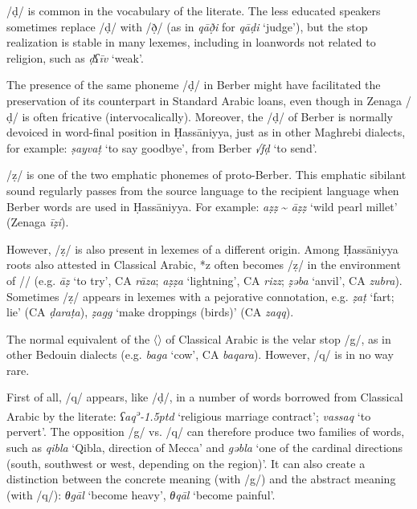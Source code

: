 \documentclass[output=paper]{langsci/langscibook}
\begin{document}
/ḍ/ is common in the vocabulary of the literate. The less educated speakers sometimes replace /ḍ/ with /ð̣/ (as in \textit{qāð̣i} for \textit{qāḍi} ‘judge’), but the stop realization is stable in many lexemes, including in loanwords not related to religion, such as \textit{ḍʕīv} ‘weak’.

The presence of the same phoneme /ḍ/ in Berber might have facilitated the preservation of its counterpart in Standard Arabic loans, even though in Zenaga /ḍ/ is often fricative (intervocalically). Moreover, the /ḍ/ of Berber is normally devoiced in word-final position in Ḥassāniyya, just as in other Maghrebi dialects, for example: \textit{ṣayvaṭ} ‘to say goodbye’, from Berber \textit{√fḍ} ‘to send’.

/ẓ/ is one of the two emphatic phonemes of proto-Berber. This emphatic sibilant sound regularly passes from the source language to the recipient language when Berber words are used in Ḥassāniyya. For example: \textit{aẓẓ} \~{} \textit{āẓẓ} ‘wild pearl millet’ (Zenaga \textit{īẓi}).

However, /ẓ/ is also present in lexemes of a different origin. Among Ḥassāniyya roots also attested in Classical Arabic, *z often becomes /ẓ/ in the environment of /{\R}/ (e.g. \textit{{\R}āẓ} ‘to try’, CA \textit{rāza}; \textit{{\R}aẓẓa} ‘lightning’, CA \textit{rizz}; \textit{ẓəb{\R}a} ‘anvil’, CA \textit{zubra}). Sometimes /ẓ/ appears in lexemes with a pejorative connotation, e.g. \textit{ẓ{\R}aṭ} ‘fart; lie’ (CA \textit{ḍaraṭa}), \textit{ẓagg} ‘make droppings (birds)’ (CA \textit{zaqq}).

The normal equivalent of the 〈{}〉 of Classical Arabic is the velar stop /g/, as in other Bedouin dialects (e.g. \textit{bag{\R}a} ‘cow’, CA \textit{baqara}). However, /q/ is in no way rare.

First of all, /q/ appears, like /ḍ/, in a number of words borrowed from Classical Arabic by the literate: \textit{ʕaq\kern 0.5pt\textsuperscript{ə}\kern -1.5ptd} ‘religious marriage contract’; \textit{vassaq} ‘to pervert’. The opposition /g/ vs. /q/ can therefore produce two families of words, such as \textit{qibla} ‘Qibla, direction of Mecca’ and \textit{gəbla} ‘one of the cardinal directions (south, southwest or west, depending on the region)’. It can also create a distinction between the concrete meaning (with /g/) and the abstract meaning (with /q/): \textit{θgāl} ‘become heavy’, \textit{θqāl} ‘become painful’.
\end{document}
